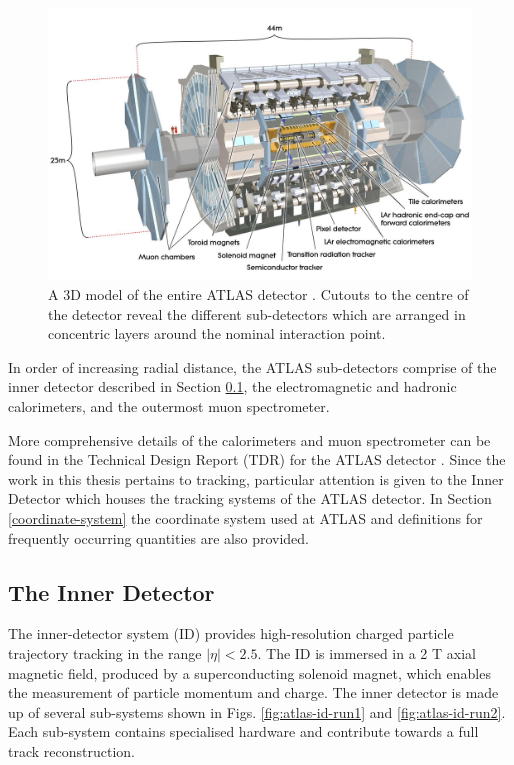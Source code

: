 \begin{figure}[htb!]
\includegraphics[width=\textwidth]{images/2-LHC-ATLAS/atlas_detector.jpg}
\caption{A 3D model of the entire ATLAS detector \cite{Jon-And:1237407}. Cutouts to the centre of the detector reveal the different sub-detectors which are arranged in concentric layers around the nominal interaction point.}
\label{fig: atlas-detector}
\end{figure}

In order of increasing radial distance, the ATLAS sub-detectors comprise of the inner detector described in Section \ref{inner-detector}, the electromagnetic and hadronic calorimeters, and the outermost muon spectrometer. 

More comprehensive details of the calorimeters and muon spectrometer can be found in the Technical Design Report (TDR) for the ATLAS detector \cite{inner-detector-TDR}. Since the work in this thesis pertains to tracking, particular attention is given to the Inner Detector which houses the tracking systems of the ATLAS detector. In Section \ref{coordinate-system} the coordinate system used at ATLAS and definitions for frequently occurring quantities are also provided.



\subsection{The Inner Detector}
\label{inner-detector}

The inner-detector system (ID) provides high-resolution charged particle trajectory tracking in the range $ \lvert \eta \rvert < 2.5$. The ID is immersed in a 2 T axial magnetic field, produced by a superconducting solenoid magnet, which enables the measurement of particle momentum and charge. The inner detector is made up of several sub-systems shown in Figs. \ref{fig:atlas-id-run1} and \ref{fig:atlas-id-run2}. Each sub-system contains specialised hardware and contribute towards a full track reconstruction. 


